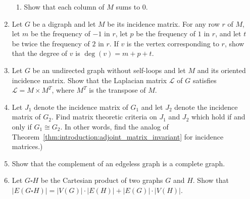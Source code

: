 \begin{enumerate}
\begin{enumerate}
  \item Show that each column of $M$ sums to $0$.
  \end{enumerate}

\item Let $G$ be a digraph and let $M$ be its incidence matrix. For
  any row $r$ of $M$, let $m$ be the frequency of $-1$ in $r$, let
  $p$ be the frequency of $1$ in $r$, and let $t$ be twice the
  frequency of $2$ in $r$. If $v$ is the vertex corresponding to
  $r$, show that the degree of $v$ is $\deg(v) = m + p + t$.

\item Let $G$ be an undirected graph without self-loops and let $M$
  and its oriented incidence matrix. Show that the Laplacian matrix
  $\mathcal{L}$ of $G$ satisfies $\mathcal{L} = M \times M^T$, where
  $M^T$ is the transpose of $M$.

\item Let $J_1$ denote the incidence matrix of $G_1$ and let $J_2$
  denote the incidence matrix of $G_2$. Find matrix theoretic criteria
  on $J_1$ and $J_2$ which hold if and only if $G_1 \cong G_2$. In
  other words, find the analog of
  Theorem~\ref{thm:introduction:adjoint_matrix_invariant} for
  incidence matrices.)

\item Show that the complement of an edgeless graph is a complete
  graph.

\item Let $G \square H$ be the Cartesian product of two graphs $G$ and
  $H$. Show that
  $|E(G \square H)| = |V(G)| \cdot |E(H)| + |E(G)| \cdot |V(H)|$.
\end{enumerate}
